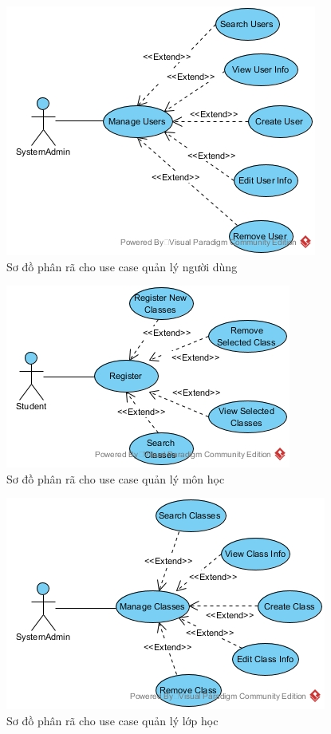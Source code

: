 \documentclass[12pt]{book}
\begin{document}
  \FloatBarrier
  \begin{figure}[ht]
    \centering
    \includegraphics[scale=0.5]{../pictures/projectdiagrams/Manage-Users-uc-destructing.jpg}
    \caption{Sơ đồ phân rã cho use case quản lý người dùng}
  \end{figure}
  \FloatBarrier

  \FloatBarrier
  \begin{figure}[ht]
    \centering
    \includegraphics[scale=0.5]{../pictures/projectdiagrams/Manage-Subjects-uc-destructing.jpg}
    \caption{Sơ đồ phân rã cho use case quản lý môn học}
  \end{figure}
  \FloatBarrier

  \FloatBarrier
  \begin{figure}[ht]
    \centering
    \includegraphics[scale=0.5]{../pictures/projectdiagrams/Manage-Classes-uc-destructing.jpg}
    \caption{Sơ đồ phân rã cho use case quản lý lớp học}
  \end{figure}
  \FloatBarrier
\end{document}
